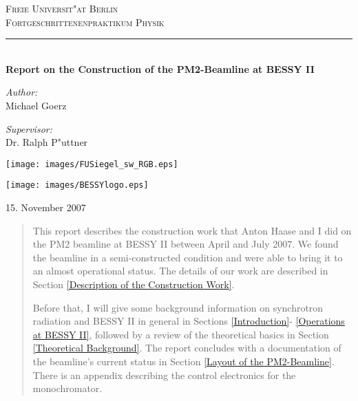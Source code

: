\documentclass[a4paper,10pt]{article}
\begin{document}
\begin{titlepage}
    \centering
    \textsc{\LARGE Freie Universit"at Berlin \\[0.3cm]
Fortgeschrittenenpraktikum Physik}
    \rule{\linewidth}{0.5mm}\\[4.5cm]
    \textbf{\Large Report on the Construction of the  PM2-Beamline at BESSY II}
    \\[3.0cm]
    \begin{minipage}{0.4\textwidth}
        \begin{flushleft}
        {\Large \emph{Author:} \\[0.1cm] Michael Goerz}
        \end{flushleft}
    \end{minipage}
    \begin{minipage}{0.4\textwidth}
        \begin{flushright}
        {\Large \emph{Supervisor:} \\[0.1cm] Dr. Ralph P"uttner}
        \end{flushright}
    \end{minipage}
    \vfill
    \begin{minipage}{0.4\textwidth}
        \begin{flushleft}
        \centering
        \texttt{[image: images/FUSiegel\_sw\_RGB.eps]}
        \end{flushleft}
    \end{minipage}
    \begin{minipage}{0.4\textwidth}
        \begin{flushright}
        \centering
        \texttt{[image: images/BESSYlogo.eps]}
        \end{flushright}
    \end{minipage}
    \vfill
    \large{15. November 2007}
\end{titlepage}

\tableofcontents
\newpage


\def\abstractname{Summary}
\begin{abstract}
    This report describes the construction work that  Anton
Haase and I did on the PM2 beamline at BESSY II between April and July 2007. We
found the beamline in a semi-constructed condition and were able to bring it to
an almost operational status. The details of our work are described in Section
\ref{Description of the Construction Work}.

    Before that, I will give some background information on synchrotron
radiation and BESSY II in general in Sections \ref{Introduction}-
\ref{Operations at BESSY II}, followed by a review of the theoretical basics in
Section \ref{Theoretical Background}.
The report concludes with a documentation of the beamline's current status in
Section \ref{Layout of the PM2-Beamline}. There is an appendix describing the
control electronics for the monochromator.
\end{abstract}
\end{document}
